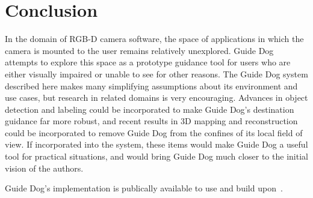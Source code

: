 \section{Conclusion}
\label{sec:conclusion}

In the domain of RGB-D camera software, the space of applications in which the
camera is mounted to the user remains relatively unexplored. Guide Dog attempts
to explore this space as a prototype guidance tool for users who are either
visually impaired or unable to see for other reasons. The Guide Dog system
described here makes many simplifying assumptions about its environment and
use cases, but research in related domains is very encouraging. Advances in
object detection and labeling could be incorporated to make Guide Dog's
destination guidance far more robust, and recent results in 3D mapping and
reconstruction could be incorporated to remove Guide Dog from the confines
of its local field of view. If incorporated into the system, these items
would make Guide Dog a useful tool for practical situations, and would bring
Guide Dog much closer to the initial vision of the authors. 

Guide Dog's implementation is publically available to use and build
upon~\cite{guidedog-website}.

